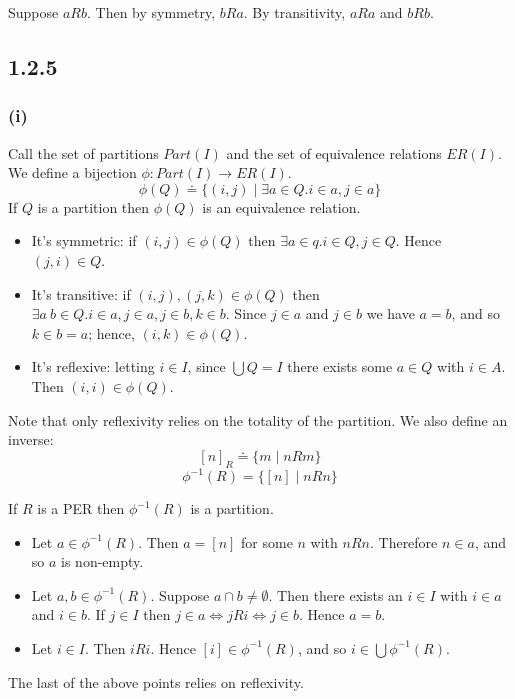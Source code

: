 \documentclass{article}
\begin{document}
Suppose $aRb$. Then by symmetry, $bRa$. By transitivity, $aRa$ and $bRb$.

\subsection*{1.2.5}

\subsubsection*{(i)}

Call the set of partitions $Part(I)$ and the set of equivalence relations $ER(I)$.
We define a bijection $\phi : Part(I) \to ER(I)$.
$$\phi(Q) \doteq \{ (i,j) \mid \exists a \in Q. i \in a, j \in a \}$$
If $Q$ is a partition then $\phi(Q)$ is an equivalence relation.
\begin{itemize}
\item It's symmetric: if $(i,j) \in \phi(Q)$ then $\exists a \in q. i \in Q, j \in Q$. Hence $(j,i) \in Q$.
\item It's transitive: if $(i,j), (j,k) \in \phi(Q)$ then $\exists a~b \in Q. i \in a, j \in a, j \in b, k \in b$.
 Since $j \in a$ and $j \in b$ we have $a = b$, and so $k \in b = a$; hence, $(i,k) \in \phi(Q)$.
\item It's reflexive: letting $i \in I$, since $\bigcup Q = I$ there exists some $a \in Q$ with $i \in A$.
 Then $(i,i) \in \phi(Q)$.
\end{itemize}

Note that only reflexivity relies on the totality of the partition.
We also define an inverse:
$$[n]_R \doteq \{ m \mid nRm \}$$
$$\phi^{-1}(R) = \{ [n] \mid nRn \}$$

If $R$ is a PER then $\phi^{-1}(R)$ is a partition.
\begin{itemize}
\item Let $a \in \phi^{-1}(R)$. Then $a = [n]$ for some $n$ with $nRn$. Therefore $n \in a$, and so $a$ is non-empty.
\item Let $a,b \in \phi^{-1}(R)$. Suppose $a \cap b \neq \emptyset$. Then there exists an $i \in I$ with $i \in a$ and
 $i \in b$. If $j \in I$ then $j \in a \Leftrightarrow jRi \Leftrightarrow j \in b$. Hence $a = b$.
\item Let $i \in I$. Then $iRi$. Hence $[i] \in \phi^{-1}(R)$, and so $i \in \bigcup \phi^{-1}(R)$.
\end{itemize}

The last of the above points relies on reflexivity. 
\end{document}
